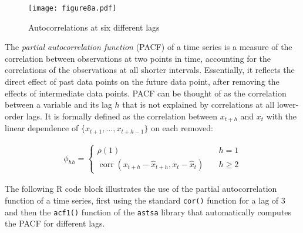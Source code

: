 \begin{figure}
\centering
\texttt{[image: figure8a.pdf]}
\caption{Autocorrelations at six different lags}
\label{fig:figure8a}
\end{figure}

The \emph{partial autocorrelation function} (PACF) of a time series is a measure of the correlation between observations at two points in time, accounting for the correlations of the observations at all shorter intervals. Essentially, it reflects the direct effect of past data points on the future data point, after removing the effects of intermediate data points. PACF can be thought of as the correlation between a variable and its lag $h$ that is not explained by correlations at all lower-order lags. It is formally defined as the correlation between $x_{t+h}$ and $x_t$ with the linear dependence of $\{x_{t+1}, \ldots, x_{t+h-1}\}$ on each removed:

\begin{align*}
\phi_{hh} = \begin{cases}\rho(1) &\quad h = 1 \\
 \operatorname{corr}(x_{t+h} - \hat{x}_{t+h}, x_t - \hat{x}_t) &\quad h \geq 2
 \end{cases}
\end{align*}

The following R code block illustrates the use of the partial autocorrelation function of a time series, first using the standard \texttt{cor()} function for a lag of $3$ and then the \texttt{acf1()} function of the \texttt{astsa} library that automatically computes the PACF for different lags.


